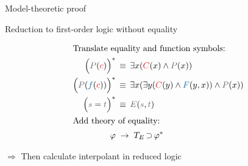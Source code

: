 \documentclass[final,hyperref={pdfpagelabels=true}]{beamer}
\newcommand{\colOne}[1]{ {\color{TuInfRed}#1}}
\newcommand{\colTwo}[1]{ {\color{TuWienBlue}#1}}
\newcommand{\colA}[1]{ \colOne{#1} }
\newcommand{\colB}[1]{ \colTwo{#1} }
\newcommand{\gray}[1]{ {\color{InfosysDarkGrey}#1}}
\newcommand{\itemizeOnBlockStart}{
		\vspace*{-0.5em}
	}
\DeclareMathOperator{\limpl}{\supset}
\begin{document}
\begin{frame}
\begin{columns}[t]
\begin{column}{\mycolwidth}
\begin{block}{Model-theoretic proof}
			\end{block}


			\begin{block}{Reduction to first-order logic without equality \cite{Craig57linear}} 
				\itemizeOnBlockStart
				\newcommand{\transformsep}{\;\to\;}
				\begin{align*}
					\intertext{Translate equality and function symbols:}
					\Big(\gray P(\colA c)\Big)^*  & \, \equiv \, \exists x (\colA C(x) \land \gray P(x)) \\
					\Big( \gray P(\colB f( \colA c)) \Big)^* & \, \equiv \, \exists x (  \exists y( \colA C(y) \land \colB F(y, x)) \land \gray P(x)) \\
					\Big( \gray s = \gray t \Big)^* & \, \equiv \, \gray E(\gray s, \gray t) \\
					\intertext{Add theory of equality:} 
					\varphi & \transformsep T_E \limpl \varphi^*
				\end{align*}


				$\Rightarrow$ Then calculate interpolant in reduced logic


\end{block}
\end{column}
\end{columns}
\end{frame}
\end{document}
